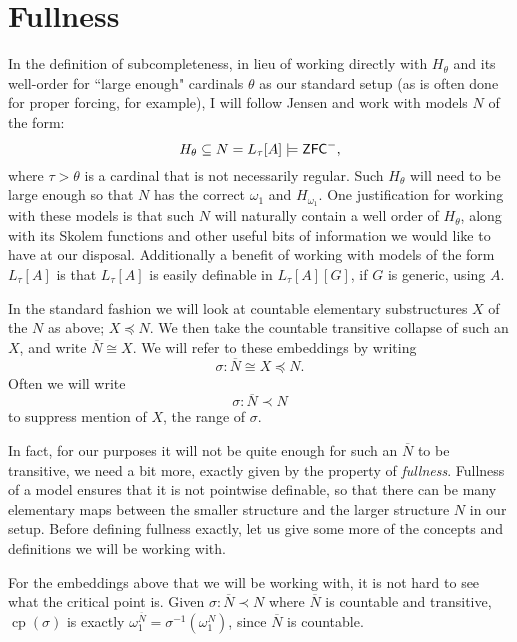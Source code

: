 \documentclass{amsart}
\theoremstyle{definition}
\theoremstyle{remark}
\newcommand{\N}{{\overline{N}}}
\newcommand{\ZFC}{\textup{\ensuremath{\textsf{ZFC}}}}
\DeclareMathOperator{\cp}{cp}
\begin{document}
\section{Fullness}
\label{sec:fullness}
In the definition of subcompleteness, in lieu of working directly with $H_\theta$ and its well-order for ``large enough" cardinals $\theta$ as our standard setup (as is often done for proper forcing, for example), I will follow Jensen and work with models $N$ of the form: 
	$$H_\theta \subseteq N = L_\tau[A] \models \ZFC^-,$$
where $\tau>\theta$ is a cardinal that is not necessarily regular. Such $H_\theta$ will need to be large enough so that $N$ has the correct $\omega_1$ and $H_{\omega_1}$. One justification for working with these models is that such $N$ will naturally contain a well order of $H_\theta$, along with its Skolem functions and other useful bits of information we would like to have at our disposal. Additionally a benefit of working with models of the form $L_\tau[A]$ is that $L_\tau[A]$ is easily definable in $L_\tau[A][G]$, if $G$ is generic, using $A$.
	
In the standard fashion we will look at countable elementary substructures $X$ of the $N$ as above; $X \preccurlyeq N$. We then take the countable transitive collapse of such an $X$, and write $\N \cong X$. We will refer to these embeddings by writing 	$$\sigma: \N \cong X \preccurlyeq N.$$
Often we will write $$\sigma: \N \prec N$$ to suppress mention of $X$, the range of $\sigma$.
	
In fact, for our purposes it will not be quite enough for such an $\N$ to be transitive, we need a bit more, exactly given by the property of \textit{fullness}. Fullness of a model ensures that it is not pointwise definable, so that there can be many elementary maps between the smaller structure and the larger structure $N$ in our setup. Before defining fullness exactly, let us give some more of the concepts and definitions we will be working with.

For the embeddings above that we will be working with, it is not hard to see what the critical point is. Given $\sigma: \N \prec N$ where $\N$ is countable and transitive, $\cp(\sigma)$ is exactly $\omega_1^{\N} = \sigma^{-1}(\omega_1^N)$, since $\N$ is countable.
\end{document}
